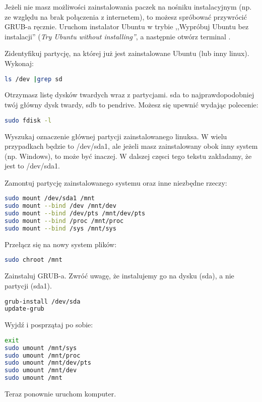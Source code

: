 Jeżeli nie masz możliwości zainstalowania paczek na nośniku instalacyjnym (np. ze względu na brak połączenia z internetem), to możesz spróbować przywrócić GRUB-a ręcznie. Uruchom instalator Ubuntu w trybie ,,Wypróbuj Ubuntu bez instalacji'' (\textit{Try Ubuntu without installing''}, a następnie otwórz terminal .

Zidentyfikuj partycję, na której już jest zainstalowane Ubuntu (lub inny linux). Wykonaj:

\begin{lstlisting}[language=bash]
ls /dev |grep sd
\end{lstlisting}

Otrzymasz listę dysków twardych wraz z partycjami. \textcolor{ubuntu_orange}{sda} to najprawdopodobniej twój główny dysk twardy, sdb to pendrive. Możesz się upewnić wydając polecenie:

\begin{lstlisting}[language=bash]
sudo fdisk -l
\end{lstlisting}

Wyszukaj oznaczenie głównej partycji zainstalowanego linuksa. W wielu przypadkach będzie to /dev/sda1, ale jeżeli masz zainstalowany obok inny system (np. Windows), to może być inaczej. W dalszej częsci tego tekstu zakładamy, że jest to /dev/sda1.

Zamontuj partycję zainstalowanego systemu oraz inne niezbędne rzeczy:
\begin{lstlisting}[language=bash]
sudo mount /dev/sda1 /mnt
sudo mount --bind /dev /mnt/dev
sudo mount --bind /dev/pts /mnt/dev/pts
sudo mount --bind /proc /mnt/proc
sudo mount --bind /sys /mnt/sys
\end{lstlisting}

Przełącz się na nowy system plików:

\begin{lstlisting}[language=bash]
sudo chroot /mnt
\end{lstlisting}

Zainstaluj GRUB-a. Zwróć uwagę, że instalujemy go na dysku (sda), a nie partycji (sda1).

\begin{lstlisting}[language=bash]
grub-install /dev/sda
update-grub
\end{lstlisting}

Wyjdź i posprzątaj po sobie:

\begin{lstlisting}[language=bash]
exit
sudo umount /mnt/sys
sudo umount /mnt/proc
sudo umount /mnt/dev/pts
sudo umount /mnt/dev
sudo umount /mnt
\end{lstlisting}

Teraz ponownie uruchom komputer.
